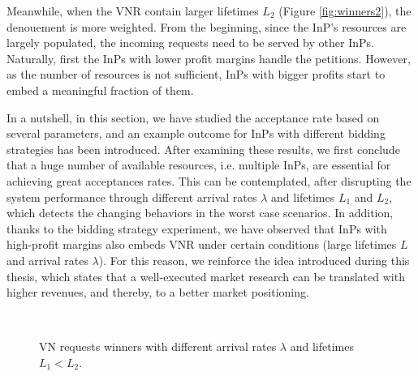 Meanwhile, when the VNR contain larger lifetimes $L_2$ (Figure \ref{fig:winners2}), the denouement is more weighted. From the beginning, since the InP's resources are largely populated, the incoming requests need to be served by other InPs. Naturally, first the InPs with lower profit margins handle the petitions. However, as the number of resources is not sufficient, InPs with bigger profits start to embed a meaningful fraction of them.

In a nutshell, in this section, we have studied the acceptance rate based on several parameters, and an example outcome for InPs with different bidding strategies has been introduced. After examining these results, we first conclude that a huge number of available resources, i.e. multiple InPs, are essential for achieving great acceptances rates. This can be contemplated, after disrupting the system performance through different arrival rates $\lambda$ and lifetimes $L_1$ and $L_2$, which detects the changing behaviors in the worst case scenarios. In addition, thanks to the bidding strategy experiment, we have observed that InPs with high-profit margins also embeds VNR under certain conditions (large lifetimes $L$ and arrival rates $\lambda$). For this reason, we reinforce the idea introduced during this thesis, which states that a well-executed market research can be translated with higher revenues, and thereby, to a better market positioning.

\begin{figure}[t]
	\myfloatalign
	 \quad
	 \\
	\caption{VN requests winners with different arrival rates $\lambda$ and lifetimes $L_1 < L_2$.}
	\label{fig:winners}
\end{figure}


